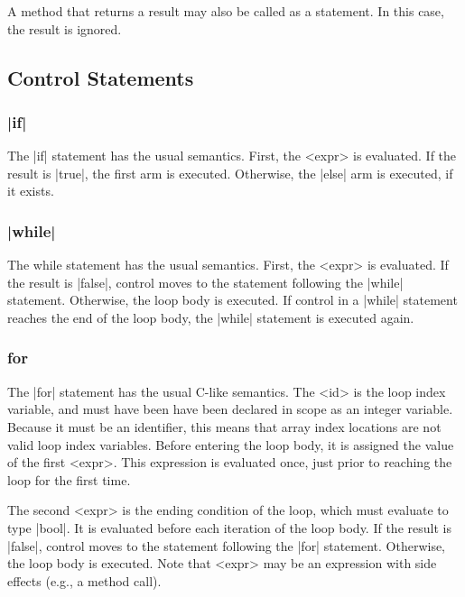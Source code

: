 \documentclass[11pt]{article}
\gdef\kw#1{{\bnf K[#1]}}
\begin{document}
A method that returns a result may also be called as a statement.
In this case, the result is ignored.

\subsection{Control Statements}

\subsubsection{\decaf|if|}
The \decaf|if| statement has the usual semantics.
First, the {\bnf <expr>} is evaluated.
If the result is \decaf|true|, the first arm is executed.
Otherwise, the \decaf|else| arm is executed, if it exists.


\subsubsection{\decaf|while|}
The while statement has the usual semantics.
First, the {\bnf <expr>} is evaluated.
If the result is \decaf|false|, control moves to the statement following the \decaf|while| statement.
Otherwise, the loop body is executed.
If control in a \decaf|while| statement reaches the end of the loop body, the \decaf|while| statement is executed again.


\subsubsection{for}
The \decaf|for| statement has the usual C-like semantics.
The {\bnf <id>} is the loop index variable, and must have been have been declared in scope as an integer variable.
Because it must be an identifier, this means that array index locations are not valid loop index variables.
Before entering the loop body, it is assigned the value of the first {\bnf <expr>}.
This expression is evaluated once, just prior to reaching the loop for the first time.

The second {\bnf <expr>} is the ending condition of the loop, which must evaluate to type \decaf|bool|.
It is evaluated before each iteration of the loop body.
If the result is \decaf|false|, control moves to the statement following the \decaf|for| statement.
Otherwise, the loop body is executed.
Note that {\bnf <expr>} may be an expression with side effects (e.g., a method call).
\end{document}
